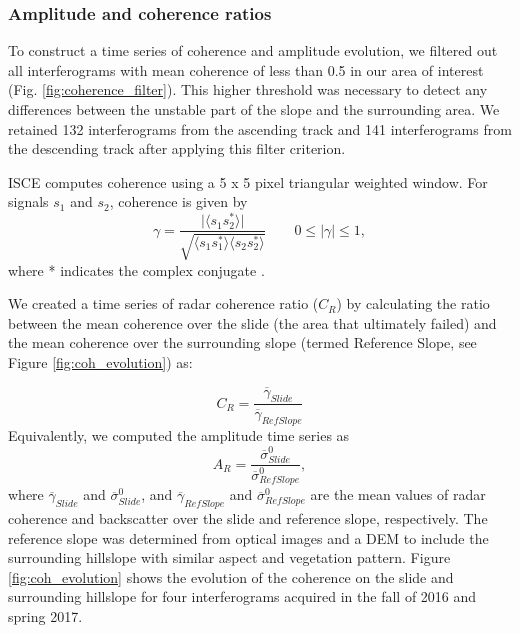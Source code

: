 \documentclass[journal abbreviation, manuscript]{copernicus}
\begin{document}
\subsubsection{Amplitude and coherence ratios}
To construct a time series of coherence and amplitude evolution, we filtered out all interferograms with mean coherence of less than 0.5 in our area of interest (Fig. \ref{fig:coherence_filter}). This higher threshold was necessary to detect any differences between the unstable part of the slope and the surrounding area. We retained 132 interferograms from the ascending track and 141 interferograms from the descending track after applying this filter criterion.\par 
ISCE computes coherence using a 5 x 5 pixel triangular weighted window. For signals $s_1$ and $s_2$, coherence is given by
\begin{equation}
    \gamma = \frac{\lvert \langle s_1 s^*_2\rangle\rvert}{\sqrt{\langle s_1 s^*_1\rangle \langle s_2 s^*_2\rangle}}\qquad 0\leq | \gamma | \leq 1,
\end{equation}
where * indicates the complex conjugate \citep{jung2016}.\par
We created a time series of radar coherence ratio ($C_R$) by calculating the ratio between the mean coherence over the slide (the area that ultimately failed) and the mean coherence over the surrounding slope (termed Reference Slope, see Figure \ref{fig:coh_evolution}) as:\par
\begin{equation}
    C_R=\frac{\overline{\gamma}_{Slide}}{\overline{\gamma}_{RefSlope}}
\end{equation}
Equivalently, we computed the amplitude time series as
\begin{equation}
    A_R=\frac{\overline{\sigma}^0_{Slide}}{\overline{\sigma}^0_{RefSlope}},
\end{equation}
where $\overline{\gamma}_{Slide}$ and $\overline{\sigma}^0_{Slide}$, and $\overline{\gamma}_{RefSlope}$ and $\overline{\sigma}^0_{RefSlope}$ are the mean values of radar coherence and backscatter over the slide and reference slope, respectively. The reference slope was determined from optical images and a DEM to include the surrounding hillslope with similar aspect and vegetation pattern. Figure \ref{fig:coh_evolution} shows the evolution of the coherence on the slide and surrounding hillslope for four interferograms acquired in the fall of 2016 and spring 2017.  
\end{document}
